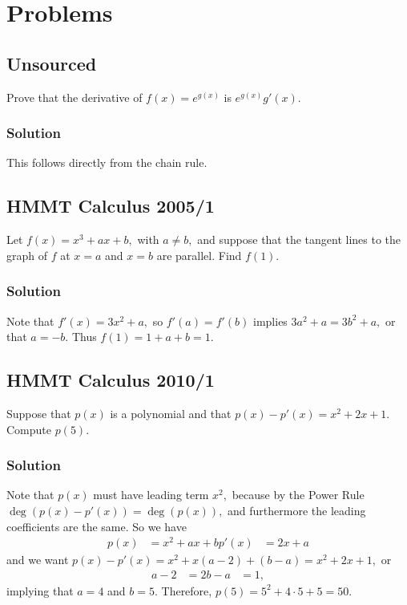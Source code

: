 \documentclass[blue,onecol]{shooting}
\begin{document}
\section{Problems}

\subsection{Unsourced}

Prove that the derivative of $f(x)=e^{g(x)}$ is $e^{g(x)}g'(x).$

\subsubsection{Solution}
This follows directly from the chain rule.

\subsection{HMMT Calculus 2005/1}

Let $f(x)=x^3+ax+b,$ with $a\neq b,$ and suppose that the tangent lines to the graph of $f$ at $x=a$ and $x=b$ are parallel. Find $f(1).$

\subsubsection{Solution}
Note that $f'(x)=3x^2+a,$ so $f'(a)=f'(b)$ implies $3a^2+a=3b^2+a,$ or that $a=-b.$ Thus $f(1)=1+a+b=1.$


\subsection{HMMT Calculus 2010/1}

Suppose that $p(x)$ is a polynomial and that $p(x)-p'(x)=x^2+2x+1.$ Compute $p(5).$

\subsubsection{Solution}
Note that $p(x)$ must have leading term $x^2,$ because by the Power Rule $\deg(p(x)-p'(x))=\deg(p(x)),$ and furthermore the leading coefficients are the same. So we have
\begin{align*}
p(x)&=x^2+ax+b 
p'(x)&=2x+a
\end{align*}
and we want $p(x)-p'(x)=x^2+x(a-2)+(b-a)=x^2+2x+1,$ or
\begin{align*}
a-2&=2 
b-a&= 1,
\end{align*}
implying that $a=4$ and $b=5.$ Therefore, $p(5)=5^2+4\cdot 5+5=50.$
\end{document}

